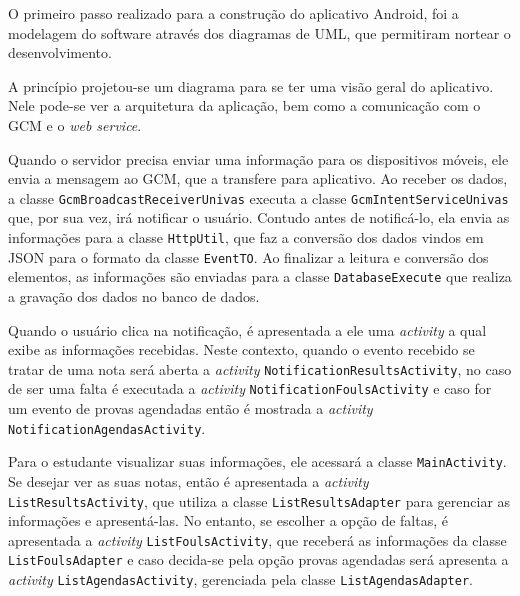 
	\par O primeiro passo realizado para a construção do aplicativo Android, foi a
modelagem do software através dos diagramas de UML, que permitiram nortear o
desenvolvimento.

	\par A princípio projetou-se um diagrama para se ter uma visão geral do
aplicativo. Nele pode-se ver a arquitetura da aplicação, bem como a comunicação
com o GCM e o \textit{web service}.

	\par Quando o servidor precisa enviar uma informação para os dispositivos
móveis, ele envia a mensagem ao GCM, que a transfere para aplicativo. Ao
receber os dados, a classe \texttt{GcmBroadcastReceiverUnivas} executa a classe
\texttt{GcmIntentServiceUnivas} que, por sua vez, irá notificar o usuário.
Contudo antes de notificá-lo, ela envia as informações para a classe
\texttt{HttpUtil}, que faz a conversão dos dados vindos em JSON para o formato
da classe \texttt{EventTO}. Ao finalizar a leitura e conversão dos elementos,
as informações são enviadas para a classe \texttt{DatabaseExecute} que realiza
a gravação dos dados no banco de dados.

	\par Quando o usuário clica na notificação, é apresentada a ele uma
\textit{activity} a qual exibe as informações recebidas. Neste contexto, quando
o evento recebido se tratar de uma nota será aberta a \textit{activity}
\texttt{NotificationResultsActivity}, no caso de ser uma falta é executada a
\textit{activity} \texttt{NotificationFoulsActivity} e caso for um evento de
provas agendadas então é mostrada a \textit{activity}
\texttt{NotificationAgendasActivity}.

	\par Para o estudante visualizar suas informações, ele acessará a classe
\texttt{MainActivity}. Se desejar ver as suas notas, então é apresentada a
\textit{activity} \texttt{ListResultsActivity}, que utiliza a classe
\texttt{ListResultsAdapter} para gerenciar as informações e apresentá-las. No
entanto, se escolher a opção de faltas, é apresentada a \textit{activity}
\texttt{ListFoulsActivity}, que receberá as informações da classe
\texttt{ListFoulsAdapter} e caso decida-se pela opção provas agendadas será
apresenta a \textit{activity} \texttt{ListAgendasActivity}, gerenciada pela
classe \texttt{ListAgendasAdapter}.

